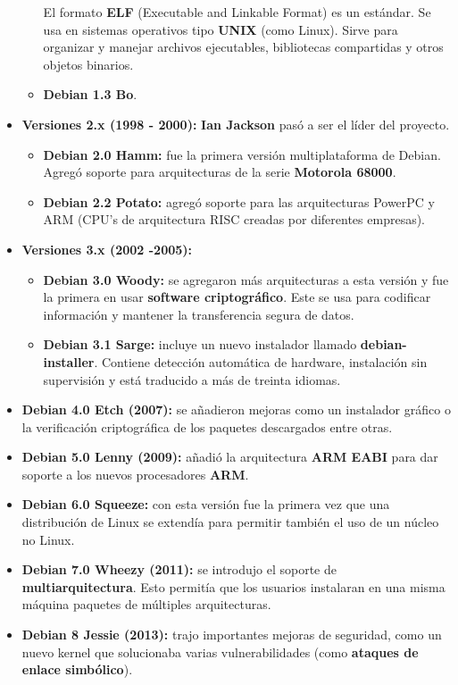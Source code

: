 \documentclass[a4paper, 12pt]{book}
\begin{document}
\begin{itemize}
\begin{itemize}
		El formato \textbf{ELF} (Executable and Linkable Format) es un estándar. Se usa en sistemas operativos tipo \textbf{UNIX} (como Linux). Sirve para organizar y manejar archivos ejecutables, bibliotecas compartidas y otros objetos binarios.
		\item \textbf {Debian 1.3 Bo}.
	\end{itemize}
	\item \textbf {Versiones 2.x (1998 - 2000):} \textbf{Ian Jackson} pasó a ser el líder del proyecto.
	\begin{itemize}
		\item \textbf {Debian 2.0 Hamm: }fue la primera versión multiplataforma de Debian. Agregó soporte para arquitecturas de la serie \textbf{Motorola 68000}.
		\item \textbf {Debian 2.2 Potato: }agregó soporte para las arquitecturas  PowerPC y ARM (CPU's de arquitectura RISC creadas por diferentes empresas).
	\end{itemize}
	\item \textbf {Versiones 3.x (2002 -2005):}
	\begin{itemize}
		\item \textbf {Debian 3.0 Woody: }se agregaron más arquitecturas a esta versión y fue la primera en usar \textbf {software criptográfico}. Este se usa para codificar información y mantener la transferencia segura de datos.
		\item \textbf {Debian 3.1 Sarge: }incluye un nuevo instalador llamado \textbf {debian-installer}. Contiene detección automática de hardware, instalación sin supervisión y está traducido a más de treinta idiomas.
	\end{itemize}
	\item \textbf {Debian 4.0 Etch (2007):} se añadieron mejoras como un instalador gráfico o la verificación criptográfica de los paquetes descargados entre otras.
	\item \textbf {Debian 5.0 Lenny (2009):} añadió la arquitectura \textbf {ARM EABI} para dar soporte a los nuevos procesadores \textbf {ARM}.
	\item \textbf {Debian 6.0 Squeeze: }con esta versión fue la primera vez que una distribución de Linux se extendía para permitir también el uso de un núcleo no Linux.
	\item \textbf {Debian 7.0 Wheezy (2011):} se introdujo el soporte de \textbf {multiarquitectura}. Esto permitía que los usuarios instalaran en una misma máquina paquetes de múltiples arquitecturas.
	\item \textbf {Debian 8 Jessie (2013):} trajo importantes mejoras de seguridad, como un nuevo kernel que solucionaba varias vulnerabilidades (como \textbf {ataques de enlace simbólico}).

\end{itemize}
\end{document}
